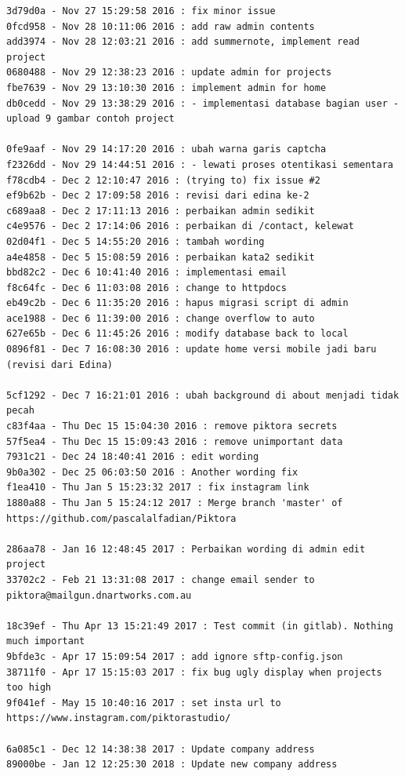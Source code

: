 \begin{lstlisting}[caption={\textit{Commit history} pada proyek Piktora},label={lst:all_commit_piktora},language=plaintext]
3d79d0a - Nov 27 15:29:58 2016 : fix minor issue
0fcd958 - Nov 28 10:11:06 2016 : add raw admin contents
add3974 - Nov 28 12:03:21 2016 : add summernote, implement read project
0680488 - Nov 29 12:38:23 2016 : update admin for projects
fbe7639 - Nov 29 13:10:30 2016 : implement admin for home
db0cedd - Nov 29 13:38:29 2016 : - implementasi database bagian user - upload 9 gambar contoh project

0fe9aaf - Nov 29 14:17:20 2016 : ubah warna garis captcha
f2326dd - Nov 29 14:44:51 2016 : - lewati proses otentikasi sementara
f78cdb4 - Dec 2 12:10:47 2016 : (trying to) fix issue #2
ef9b62b - Dec 2 17:09:58 2016 : revisi dari edina ke-2
c689aa8 - Dec 2 17:11:13 2016 : perbaikan admin sedikit
c4e9576 - Dec 2 17:14:06 2016 : perbaikan di /contact, kelewat
02d04f1 - Dec 5 14:55:20 2016 : tambah wording
a4e4858 - Dec 5 15:08:59 2016 : perbaikan kata2 sedikit
bbd82c2 - Dec 6 10:41:40 2016 : implementasi email
f8c64fc - Dec 6 11:03:08 2016 : change to httpdocs
eb49c2b - Dec 6 11:35:20 2016 : hapus migrasi script di admin
ace1988 - Dec 6 11:39:00 2016 : change overflow to auto
627e65b - Dec 6 11:45:26 2016 : modify database back to local
0896f81 - Dec 7 16:08:30 2016 : update home versi mobile jadi baru (revisi dari Edina)

5cf1292 - Dec 7 16:21:01 2016 : ubah background di about menjadi tidak pecah
c83f4aa - Thu Dec 15 15:04:30 2016 : remove piktora secrets
57f5ea4 - Thu Dec 15 15:09:43 2016 : remove unimportant data
7931c21 - Dec 24 18:40:41 2016 : edit wording
9b0a302 - Dec 25 06:03:50 2016 : Another wording fix
f1ea410 - Thu Jan 5 15:23:32 2017 : fix instagram link
1880a88 - Thu Jan 5 15:24:12 2017 : Merge branch 'master' of https://github.com/pascalalfadian/Piktora

286aa78 - Jan 16 12:48:45 2017 : Perbaikan wording di admin edit project
33702c2 - Feb 21 13:31:08 2017 : change email sender to piktora@mailgun.dnartworks.com.au

18c39ef - Thu Apr 13 15:21:49 2017 : Test commit (in gitlab). Nothing much important
9bfde3c - Apr 17 15:09:54 2017 : add ignore sftp-config.json
38711f0 - Apr 17 15:15:03 2017 : fix bug ugly display when projects too high
9f041ef - May 15 10:40:16 2017 : set insta url to https://www.instagram.com/piktorastudio/

6a085c1 - Dec 12 14:38:38 2017 : Update company address
89000be - Jan 12 12:25:30 2018 : Update new company address
\end{lstlisting}


